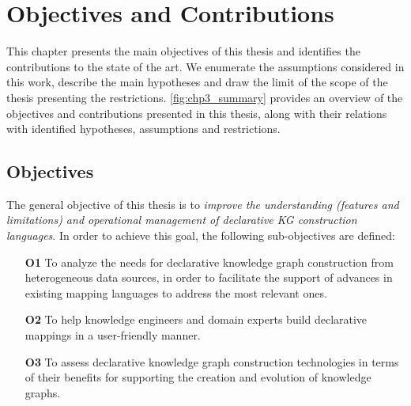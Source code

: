 \chapter{Objectives and Contributions}
\label{chapter:objectives}

This chapter presents the main objectives of this thesis and identifies the contributions to the state of the art. We enumerate the assumptions considered in this work, describe the main hypotheses and draw the limit of the scope of the thesis presenting the restrictions. \cref{fig:chp3_summary} provides an overview of the objectives and contributions presented in this thesis, along with their relations with identified hypotheses, assumptions and restrictions. 

\section{Objectives}
\label{sec:chp3-objectives}



The general objective of this thesis is to \textit{improve the understanding (features and limitations) and operational management of declarative KG construction languages}. In order to achieve this goal, the following sub-objectives are defined:

\begin{enumerate}
    \item[\textbf{O1}]  To analyze the needs for declarative knowledge graph construction from heterogeneous data sources, in order to facilitate the support of advances in existing mapping languages to address the most relevant ones. 
    \item[\textbf{O2}] To help knowledge engineers and domain experts build declarative mappings in a user-friendly manner.
    \item[\textbf{O3}] To assess declarative knowledge graph construction technologies in terms of their benefits for supporting the creation and evolution of knowledge graphs. 
\end{enumerate}

